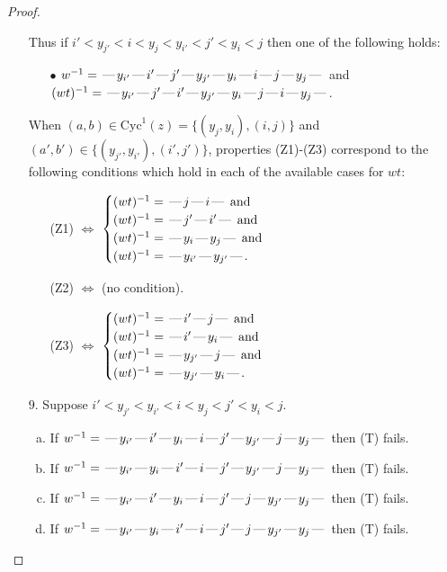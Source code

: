 \documentclass[10pt]{article}
\theoremstyle{definition}
\theoremstyle{definition}
\def\dash{\text{\hspace{0.5mm}---\hspace{0.5mm}}}
\def\Cyc{\mathrm{Cyc}}
\begin{document}
\begin{proof}
\begin{enumerate}
\begin{enumerate}[(a)]
\end{enumerate}
Thus if $i' < y_{j'} < i < y_j < y_{i'} < j' < y_i < j$ then one of the following holds:
\begin{enumerate}
\item[$\bullet$] $w^{-1} = \dash y_{i'}\dash i'\dash j'\dash y_{j'}\dash y_i\dash i\dash j\dash y_j\dash $ and $(wt)^{-1} = \dash y_{i'}\dash j'\dash i'\dash y_{j'}\dash y_i\dash j\dash i\dash y_j\dash $.
\end{enumerate}
When $(a,b)\in\Cyc^1(z)=\{(y_j,y_i),(i,j)\}$ and $(a',b')\in\{(y_{j'},y_{i'}),(i',j')\}$,
properties (Z1)-(Z3) correspond to the following conditions which
hold in each of the available cases for $wt$:
\begin{enumerate}
\item[](Z1) $\Leftrightarrow$ $\begin{cases}\text{$(wt)^{-1} = \dash j \dash i \dash$}\text{ and }\\
\text{$(wt)^{-1} = \dash j' \dash i' \dash$}\text{ and }\\
\text{$(wt)^{-1} = \dash y_i \dash y_j \dash$}\text{ and }\\
\text{$(wt)^{-1} = \dash y_{i'} \dash y_{j'} \dash$}.\end{cases}$
\item[](Z2) $\Leftrightarrow$ (no condition).
\item[](Z3) $\Leftrightarrow$ $\begin{cases}\text{$(wt)^{-1} = \dash i' \dash j \dash$}\text{ and }\\
\text{$(wt)^{-1} = \dash i' \dash y_i \dash$}\text{ and }\\
\text{$(wt)^{-1} = \dash y_{j'} \dash j \dash$}\text{ and }\\
\text{$(wt)^{-1} = \dash y_{j'} \dash y_i \dash$}.\end{cases}$
\end{enumerate}
\item[$9$.] Suppose $i' < y_{j'} < y_{i'} < i < y_j < j' < y_i < j$.
\begin{enumerate}[(a)]
\item If $w^{-1} = \dash y_{i'}\dash i'\dash y_i\dash i\dash j'\dash y_{j'}\dash j\dash y_j\dash $ then (T) fails.
\item If $w^{-1} = \dash y_{i'}\dash y_i\dash i'\dash i\dash j'\dash y_{j'}\dash j\dash y_j\dash $ then (T) fails.
\item If $w^{-1} = \dash y_{i'}\dash i'\dash y_i\dash i\dash j'\dash j\dash y_{j'}\dash y_j\dash $ then (T) fails.
\item If $w^{-1} = \dash y_{i'}\dash y_i\dash i'\dash i\dash j'\dash j\dash y_{j'}\dash y_j\dash $ then (T) fails.

\end{enumerate}
\end{enumerate}
\end{proof}
\end{document}
